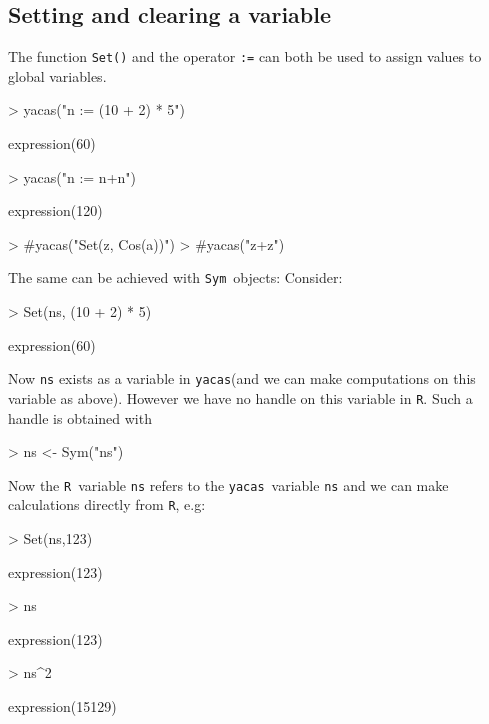 \documentclass[]{article}
\newcommand{\yacas}{{\tt yacas}}
\newcommand{\code}[1]{{\tt #1}}
\def\R{\texttt{R}}
\def\sym{\texttt{Sym}}
\begin{document}
\subsection{Setting and clearing a variable}

The function \code{Set()} and the operator \code{:=} can both be used to assign
values to global variables. 
\begin{Schunk}
\begin{Sinput}
> yacas("n := (10 + 2) * 5")
\end{Sinput}
\begin{Soutput}
expression(60)
\end{Soutput}
\begin{Sinput}
> yacas("n := n+n")
\end{Sinput}
\begin{Soutput}
expression(120)
\end{Soutput}
\begin{Sinput}
> #yacas("Set(z, Cos(a))")
> #yacas("z+z")
\end{Sinput}
\end{Schunk}

The same can be achieved with \sym\ objects: Consider:
\begin{Schunk}
\begin{Sinput}
> Set(ns, (10 + 2) * 5)
\end{Sinput}
\begin{Soutput}
expression(60)
\end{Soutput}
\end{Schunk}

Now \code{ns} exists as a variable in \yacas (and we
can make computations on this variable as above).
However we have no handle on
this variable in \R. Such a handle is obtained with
\begin{Schunk}
\begin{Sinput}
> ns <- Sym("ns")
\end{Sinput}
\end{Schunk}
Now the \R\ variable \code{ns} refers to the \yacas\ variable
\code{ns} and we can make  calculations directly from \R, e.g:
\begin{Schunk}
\begin{Sinput}
> Set(ns,123)
\end{Sinput}
\begin{Soutput}
expression(123)
\end{Soutput}
\begin{Sinput}
> ns
\end{Sinput}
\begin{Soutput}
expression(123)
\end{Soutput}
\begin{Sinput}
> ns^2
\end{Sinput}
\begin{Soutput}
expression(15129)
\end{Soutput}
\end{Schunk}
\end{document}

